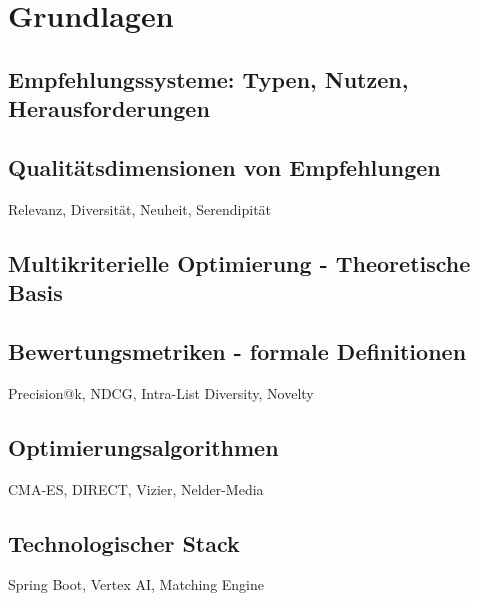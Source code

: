 \section{Grundlagen}

\subsection{Empfehlungssysteme: Typen, Nutzen, Herausforderungen}

\subsection{Qualitätsdimensionen von Empfehlungen}
Relevanz, Diversität, Neuheit, Serendipität

\subsection{Multikriterielle Optimierung - Theoretische Basis}

\subsection{Bewertungsmetriken - formale Definitionen}
Precision@k, NDCG, Intra-List Diversity, Novelty

\subsection{Optimierungsalgorithmen}
CMA-ES, DIRECT, Vizier, Nelder-Media

\subsection{Technologischer Stack}
Spring Boot, Vertex AI, Matching Engine
